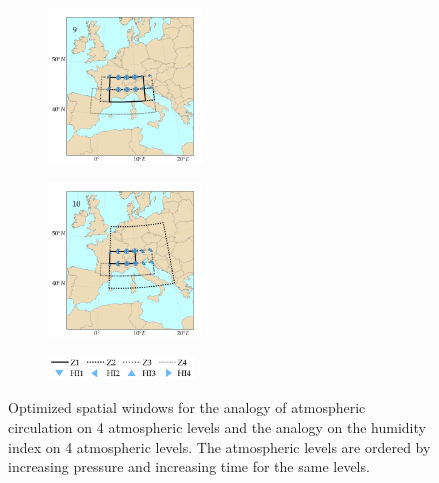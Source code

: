 \documentclass[twocol]{ametsoc}
\begin{document}
\begin{figure}[htb]
\begin{subfigure}{.5\columnwidth}
	\end{subfigure}
	\begin{subfigure}{.5\columnwidth}
		\centering
		\includegraphics[width=4.1cm]{figures/spatial_win_z4-hi4/Spatial_windows_9.png}
	\end{subfigure}%
	\begin{subfigure}{.5\columnwidth}
		\centering
		\includegraphics[width=4.1cm]{figures/spatial_win_z4-hi4/Spatial_windows_10.png}
	\end{subfigure}
	\begin{subfigure}{.5\columnwidth}
		\centering
		\includegraphics[width=3.9cm]{figures/spatial_win_z4-hi4/legend.png}
	\end{subfigure}
	\caption{Optimized spatial windows for the analogy of atmospheric circulation on 4 atmospheric levels and the analogy on the humidity index on 4 atmospheric levels. The atmospheric levels are ordered by increasing pressure and increasing time for the same levels.}
	\label{fig:spatial_windows_z4-hi4}
\end{figure}
\end{document}
